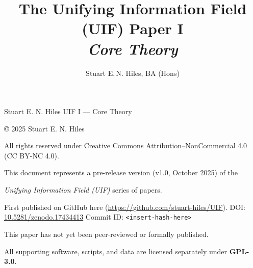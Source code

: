 
            {Stuart E. N. Hiles}
            {UIF I — Core Theory}


\title{The Unifying Information Field (UIF) Paper I\\[0.35em]
\Large\textit{Core Theory}}

\author{Stuart E.\,N. Hiles, BA (Hons)}
\date{}

\begin{center}
\thispagestyle{empty}
\vspace{2em}
{\small
© 2025 Stuart E. N. Hiles 

All rights reserved under Creative Commons Attribution–NonCommercial 4.0 (CC BY-NC 4.0).  
\newline

This document represents a pre-release version (v1.0, October 2025) of the 

\textit{Unifying Information Field (UIF)} series of papers.

First published on GitHub here (\url{https://github.com/stuart-hiles/UIF}).
\newline DOI: \href{https://doi.org/10.5281/zenodo.17434413}{10.5281/zenodo.17434413}  
Commit ID: \texttt{<insert-hash-here>}
}
\newline

This paper has not yet been peer-reviewed or formally published.  
\newline

All supporting software, scripts, and data are licensed separately under \textbf{GPL-3.0}.
\end{center}

\maketitle

